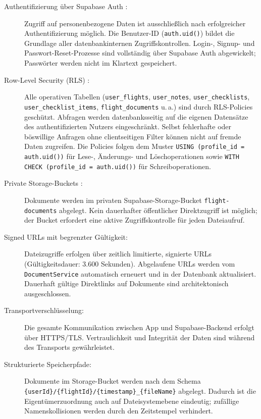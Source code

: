 \begin{description}
  \item[Authentifizierung über Supabase Auth \cite{supabaseAuth}:]
    Zugriff auf personenbezogene Daten ist ausschließlich nach
    erfolgreicher Authentifizierung möglich.
    Die Benutzer-ID (\texttt{auth.uid()}) bildet die Grundlage aller
    datenbankinternen Zugriffskontrollen.
    Login-, Signup- und Passwort-Reset-Prozesse sind vollständig
    über Supabase Auth abgewickelt; Passwörter werden nicht im
    Klartext gespeichert.

  \item[Row-Level Security (RLS) \cite{supabaseRLS}:]
    Alle operativen Tabellen (\texttt{user\_flights},
    \texttt{user\_notes}, \texttt{user\_checklists},
    \texttt{user\_checklist\_items}, \texttt{flight\_documents} u.\,a.)
    sind durch RLS-Policies geschützt.
    Abfragen werden datenbanksseitig auf die eigenen Datensätze
    des authentifizierten Nutzers eingeschränkt.
    Selbst fehlerhafte oder böswillige Anfragen ohne clientseitigen
    Filter können nicht auf fremde Daten zugreifen.
    Die Policies folgen dem Muster
    \texttt{USING (profile\_id = auth.uid())} für Lese-,
    Änderungs- und Löschoperationen sowie
    \texttt{WITH CHECK (profile\_id = auth.uid())} für Schreiboperationen.

  \item[Private Storage-Buckets \cite{supabaseStorage}:]
    Dokumente werden im privaten Supabase-Storage-Bucket
    \texttt{flight-documents} abgelegt.
    Kein dauerhafter öffentlicher Direktzugriff ist möglich;
    der Bucket erfordert eine aktive Zugriffskontrolle für
    jeden Dateiaufruf.

  \item[Signed URLs mit begrenzter Gültigkeit:]
    Dateizugriffe erfolgen über zeitlich limitierte,
    signierte URLs (Gültigkeitsdauer: 3.600 Sekunden).
    Abgelaufene URLs werden vom \texttt{DocumentService}
    automatisch erneuert und in der Datenbank aktualisiert.
    Dauerhaft gültige Direktlinks auf Dokumente sind
    architektonisch ausgeschlossen.

  \item[Transportverschlüsselung:]
    Die gesamte Kommunikation zwischen App und Supabase-Backend
    erfolgt über HTTPS/TLS.
    Vertraulichkeit und Integrität der Daten sind während
    des Transports gewährleistet.

  \item[Strukturierte Speicherpfade:]
    Dokumente im Storage-Bucket werden nach dem Schema
    \texttt{\{userId\}/\{flightId\}/\{timestamp\}\_\{fileName\}}
    abgelegt.
    Dadurch ist die Eigentümerzuordnung auch auf Dateisystemebene
    eindeutig; zufällige Namenskollisionen werden durch den
    Zeitstempel verhindert.


\end{description}
